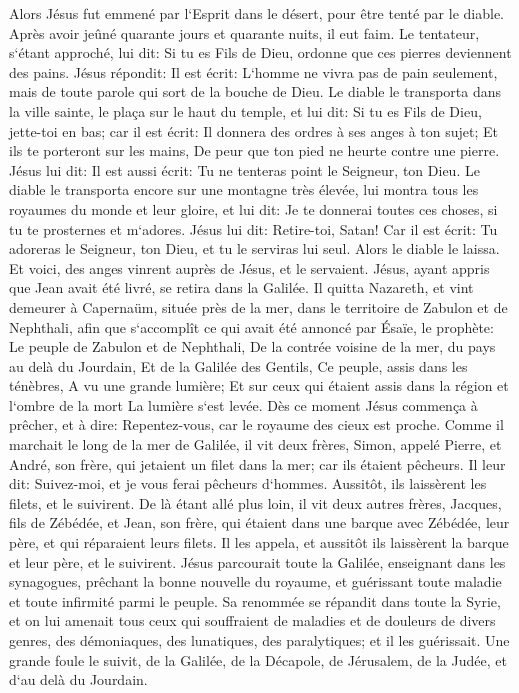\verse Alors Jésus fut emmené par l`Esprit dans le désert, pour être tenté par le diable. 
\verse Après avoir jeûné quarante jours et quarante nuits, il eut faim. 
\verse Le tentateur, s`étant approché, lui dit: Si tu es Fils de Dieu, ordonne que ces pierres deviennent des pains. 
\verse Jésus répondit: Il est écrit: L`homme ne vivra pas de pain seulement, mais de toute parole qui sort de la bouche de Dieu. 
\verse Le diable le transporta dans la ville sainte, le plaça sur le haut du temple, 
\verse et lui dit: Si tu es Fils de Dieu, jette-toi en bas; car il est écrit: Il donnera des ordres à ses anges à ton sujet; Et ils te porteront sur les mains, De peur que ton pied ne heurte contre une pierre. 
\verse Jésus lui dit: Il est aussi écrit: Tu ne tenteras point le Seigneur, ton Dieu. 
\verse Le diable le transporta encore sur une montagne très élevée, lui montra tous les royaumes du monde et leur gloire, 
\verse et lui dit: Je te donnerai toutes ces choses, si tu te prosternes et m`adores. 
\verse Jésus lui dit: Retire-toi, Satan! Car il est écrit: Tu adoreras le Seigneur, ton Dieu, et tu le serviras lui seul. 
\verse Alors le diable le laissa. Et voici, des anges vinrent auprès de Jésus, et le servaient. 
\verse Jésus, ayant appris que Jean avait été livré, se retira dans la Galilée. 
\verse Il quitta Nazareth, et vint demeurer à Capernaüm, située près de la mer, dans le territoire de Zabulon et de Nephthali, 
\verse afin que s`accomplît ce qui avait été annoncé par Ésaïe, le prophète: 
\verse Le peuple de Zabulon et de Nephthali, De la contrée voisine de la mer, du pays au delà du Jourdain, Et de la Galilée des Gentils, 
\verse Ce peuple, assis dans les ténèbres, A vu une grande lumière; Et sur ceux qui étaient assis dans la région et l`ombre de la mort La lumière s`est levée. 
\verse Dès ce moment Jésus commença à prêcher, et à dire: Repentez-vous, car le royaume des cieux est proche. 
\verse Comme il marchait le long de la mer de Galilée, il vit deux frères, Simon, appelé Pierre, et André, son frère, qui jetaient un filet dans la mer; car ils étaient pêcheurs. 
\verse Il leur dit: Suivez-moi, et je vous ferai pêcheurs d`hommes. 
\verse Aussitôt, ils laissèrent les filets, et le suivirent. 
\verse De là étant allé plus loin, il vit deux autres frères, Jacques, fils de Zébédée, et Jean, son frère, qui étaient dans une barque avec Zébédée, leur père, et qui réparaient leurs filets. 
\verse Il les appela, et aussitôt ils laissèrent la barque et leur père, et le suivirent. 
\verse Jésus parcourait toute la Galilée, enseignant dans les synagogues, prêchant la bonne nouvelle du royaume, et guérissant toute maladie et toute infirmité parmi le peuple. 
\verse Sa renommée se répandit dans toute la Syrie, et on lui amenait tous ceux qui souffraient de maladies et de douleurs de divers genres, des démoniaques, des lunatiques, des paralytiques; et il les guérissait. 
\verse Une grande foule le suivit, de la Galilée, de la Décapole, de Jérusalem, de la Judée, et d`au delà du Jourdain. 

